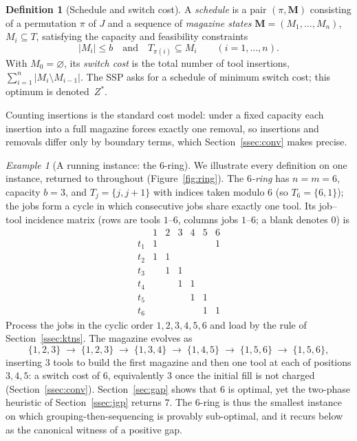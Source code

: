 \documentclass[11pt,a4paper]{article}
\theoremstyle{plain}
\theoremstyle{definition}
\newtheorem{definition}{Definition}
\theoremstyle{remark}
\newtheorem{example}{Example}
\newcommand{\Zst}{Z^{\ast}}
\begin{document}
\begin{definition}[Schedule and switch cost]\label{def:ssp}
A \emph{schedule} is a pair $(\pi,\mathbf{M})$ consisting of a permutation $\pi$ of
$J$ and a sequence of \emph{magazine states} $\mathbf{M}=(M_1,\dots,M_n)$, $M_i
\subseteq T$, satisfying the capacity and feasibility constraints
\[
  \lvert M_i\rvert\le b \quad\text{and}\quad T_{\pi(i)}\subseteq M_i
  \qquad (i=1,\dots,n).
\]
With $M_0=\varnothing$, its \emph{switch cost} is the total number of tool
insertions, $\sum_{i=1}^{n}\lvert M_i\setminus M_{i-1}\rvert$. The SSP asks for a
schedule of minimum switch cost; this optimum is denoted~$\Zst$.
\end{definition}

Counting insertions is the standard cost model: under a fixed capacity each
insertion into a full magazine forces exactly one removal, so insertions and
removals differ only by boundary terms, which Section~\ref{ssec:conv} makes precise.

\begin{example}[A running instance: the $6$-ring]\label{ex:ring}
We illustrate every definition on one instance, returned to throughout
(Figure~\ref{fig:ring}). The \emph{$6$-ring} has $n=m=6$, capacity $b=3$, and
$T_j=\{j,j+1\}$ with indices taken
modulo $6$ (so $T_6=\{6,1\}$); the jobs form a cycle in which consecutive jobs share
exactly one tool. Its job--tool incidence matrix (rows are tools $1$--$6$, columns
jobs $1$--$6$; a blank denotes $0$) is
\[
\begin{array}{c|cccccc}
      & 1 & 2 & 3 & 4 & 5 & 6\\\hline
 t_1  & 1 &   &   &   &   & 1\\
 t_2  & 1 & 1 &   &   &   &  \\
 t_3  &   & 1 & 1 &   &   &  \\
 t_4  &   &   & 1 & 1 &   &  \\
 t_5  &   &   &   & 1 & 1 &  \\
 t_6  &   &   &   &   & 1 & 1
\end{array}
\]
Process the jobs in the cyclic order $1,2,3,4,5,6$ and load by the rule of
Section~\ref{ssec:ktns}. The magazine evolves as
\[
\{1,2,3\}\;\to\;\{1,2,3\}\;\to\;\{1,3,4\}\;\to\;\{1,4,5\}\;\to\;\{1,5,6\}\;\to\;
\{1,5,6\},
\]
inserting $3$ tools to build the first magazine and then one tool at each of
positions $3,4,5$: a switch cost of $6$, equivalently $3$ once the initial fill is
not charged (Section~\ref{ssec:conv}). Section~\ref{sec:gap} shows that $6$ is
optimal, yet the two-phase heuristic of Section~\ref{ssec:jgp} returns $7$. The
$6$-ring is thus the smallest instance on which grouping-then-sequencing is provably
sub-optimal, and it recurs below as the canonical witness of a positive gap.
\end{example}
\end{document}
